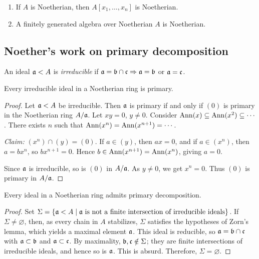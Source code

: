 \documentclass[11pt,a4paper]{article}
\begin{document}
\setcounter{theorem}{16}\begin{corollary}
\begin{enumerate}[label=(\roman*)]
\setcounter{enumi}{0}\item If $A$ is Noetherian, then $A[x_1,\ldots,x_n]$ is Noetherian.
\setcounter{enumi}{1}\item A finitely generated algebra over Noetherian $A$ is Noetherian.
\end{enumerate}
\end{corollary}
\subsection{Noether's work on primary decomposition}
\setcounter{definition}{12}\begin{definition}
An ideal $\aa<A$ is \emph{irreducible} if $\aa=\bb\cap\mathfrak c\Rightarrow\aa=\bb$ or $\aa=\mathfrak c$.
\end{definition}
\setcounter{theorem}{17}\begin{proposition}
Every irreducible ideal in a Noetherian ring is primary.
\end{proposition}
\begin{proof}
Let $\aa<A$ be irreducible. Then $\aa$ is primary if and only if $(0)$ is primary in the Noetherian ring $A/\aa$. Let $xy=0$, $y\ne0$. Consider $\Ann(x)\subseteq\Ann(x^2)\subseteq\cdots$. There exists $n$ such that $\Ann(x^n)=\Ann(x^{n+1})=\cdots$.

\emph{Claim:} $(x^n)\cap(y)=(0)$. If $a\in(y)$, then $ax=0$, and if $a\in(x^n)$, then $a=bx^n$, so $bx^{n+1}=0$. Hence $b\in\Ann(x^{n+1})=\Ann(x^n)$, giving $a=0$.

Since $\aa$ is irreducible, so is $(0)$ in $A/\aa$. As $y\ne0$, we get $x^n=0$. Thus $(0)$ is primary in $A/\aa$.
\end{proof}
\setcounter{theorem}{18}\begin{theorem}
Every ideal in a Noetherian ring admits primary decomposition.
\end{theorem}
\begin{proof}
Set $\Sigma=\{\aa<A\mid\aa\text{ is not a finite intersection of irreducible ideals}\}$. If $\Sigma\ne\varnothing$, then, as every chain in $A$ stabilizes, $\Sigma$ satisfies the hypotheses of Zorn's
lemma, which yields a maximal element $\aa$. This ideal is reducible, so $\aa=\bb\cap\mathfrak c$ with $\aa\subset\bb$ and $\aa\subset\mathfrak c$. By maximality, $\bb,\mathfrak c\notin\Sigma$; they are finite intersections of irreducible ideals, and hence so is $\aa$. This is absurd. Therefore, $\Sigma=\varnothing$.
\end{proof}
\end{document}
